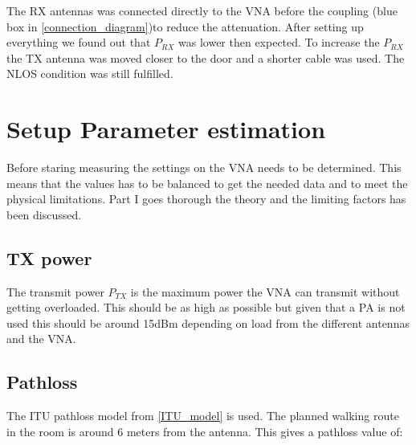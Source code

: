 The RX antennas was connected directly to the VNA before the coupling (blue box in \autoref{connection_diagram})to reduce the attenuation. After setting up everything we found out that $P_{RX}$ was lower then expected. To increase the $P_{RX}$ the TX antenna was moved closer to the door and a shorter cable was used. The NLOS condition was still fulfilled. 

%
%


\chapter{Setup Parameter estimation}
Before staring measuring the settings on the VNA needs to be determined. This means that the values has to be  balanced to get the needed data and to meet the physical limitations. Part I goes thorough the theory and the limiting factors has been discussed.



\section{TX power}
The transmit power $P_{TX}$ is the maximum power the VNA can transmit without getting overloaded. This should be as high as possible but given that a \gls{PA} is not used this should be around 15dBm \citep{Key_PNA} depending on load from the different antennas and the VNA.
\section{Pathloss}
The ITU pathloss model from \autoref{ITU_model} is used. The planned walking route in the room is around 6 meters from the antenna. This gives a pathloss value of:



